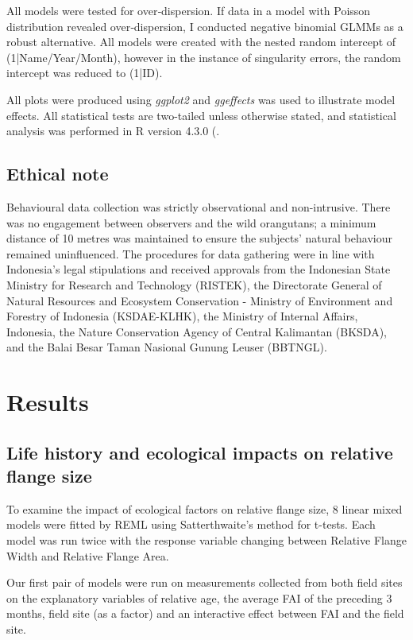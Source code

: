 All models were tested for over‐dispersion. If data in a model with Poisson distribution revealed over‐dispersion, I conducted negative binomial GLMMs as a robust alternative. All models were created with the nested random intercept of (1|Name/Year/Month), however in the instance of singularity errors, the random intercept was reduced to (1|ID).

All plots were produced using \textit{ggplot2} and \textit{ggeffects} was used to illustrate model effects. All statistical tests are two-tailed unless otherwise stated, and statistical analysis was performed in R version 4.3.0 (\citep{R.2018, Wickham.2011, Lüdecke.2018}. 

\subsection{Ethical note}
Behavioural data collection was strictly observational and non-intrusive. There was no engagement between observers and the wild orangutans; a minimum distance of 10 metres was maintained to ensure the subjects' natural behaviour remained uninfluenced. The procedures for data gathering were in line with Indonesia's legal stipulations and received approvals from the Indonesian State Ministry for Research and Technology (RISTEK), the Directorate General of Natural Resources and Ecosystem Conservation - Ministry of Environment and Forestry of Indonesia (KSDAE-KLHK), the Ministry of Internal Affairs, Indonesia, the Nature Conservation Agency of Central Kalimantan (BKSDA), and the Balai Besar Taman Nasional Gunung Leuser (BBTNGL).

\section{Results}
\subsection{Life history and ecological impacts on relative flange size}
To examine the impact of ecological factors on relative flange size, 8 linear mixed models were fitted by REML using Satterthwaite's method for t-tests. Each model was run twice with the response variable changing between Relative Flange Width and Relative Flange Area. 

Our first pair of models were run on measurements collected from both field sites on the explanatory variables of relative age, the average FAI of the preceding 3 months, field site (as a factor) and an interactive effect between FAI and the field site.

